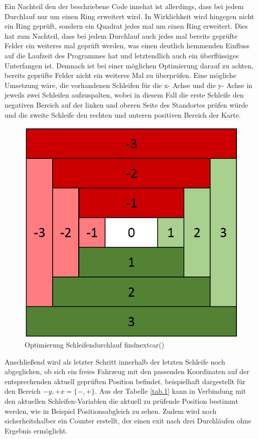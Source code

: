 Ein Nachteil den der beschriebene Code innehat ist allerdings, dass bei jedem Durchlauf nur um einen Ring erweitert wird. In Wirklichkeit wird hingegen nicht ein Ring geprüft, sondern ein Quadrat jedes mal um einen Ring erweitert. Dies hat zum Nachteil, dass bei jedem Durchlauf auch jedes mal bereits geprüfte Felder ein weiteres mal geprüft werden, was einen deutlich hemmenden Einfluss auf die Laufzeit des Programmes hat und letztendlich auch ein überflüssiges Unterfangen ist. Demnach ist bei einer möglichen Optimierung darauf zu achten, bereits geprüfte Felder nicht ein weiteres Mal zu überprüfen. Eine mögliche Umsetzung wäre, die vorhandenen Schleifen für die x- Achse  und die y- Achse in jeweils zwei Schleifen aufzuspalten, wobei in diesem Fall die erste Schleife den negativen Bereich auf der linken und oberen Seite des Standortes prüfen würde und die zweite Schleife den rechten und unteren positiven Bereich der Karte.
\begin{figure}[h]
\caption{Optimierung Schleifendurchlauf findnextcar()}
\centering
\includegraphics[scale=0.5]{opti_findnextcar}
\end{figure}
Anschließend wird als letzter Schritt innerhalb der letzten Schleife noch abgeglichen, ob sich ein freies Fahrzeug mit den passenden Koordinaten auf der entsprechenden aktuell geprüften Position befindet, beispielhaft dargestellt für den Bereich $-y,+x = \{-,+\}$. Aus der Tabelle \ref{tab.1} kann in Verbindung mit den aktuellen Schleifen-Variablen die aktuell zu prüfende Position bestimmt werden, wie in Beispiel Positionsabgleich zu sehen. Zudem wird noch sicherheitshalber ein Counter erstellt, der einen exit nach drei Durchläufen ohne Ergebnis ermöglicht.
